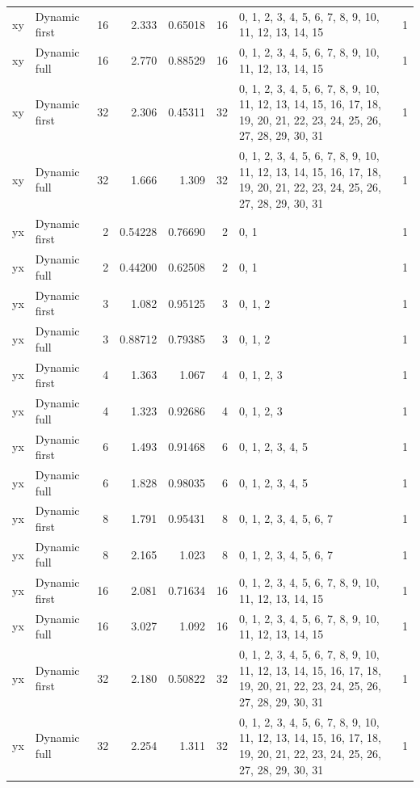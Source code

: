 \documentclass[10pt,a4paper]{article}
\begin{document}
\begin{longtable}{@{}p{23mm}p{29mm}rrrrp{36mm}r@{}}
xy & Dynamic first & 16 & 2.333 & 0.65018 & 16 & 0, 1, 2, 3, 4, 5, 6, 7, 8, 9, 10, 11, 12, 13, 14, 15 & 1 \\
xy & Dynamic full & 16 & 2.770 & 0.88529 & 16 & 0, 1, 2, 3, 4, 5, 6, 7, 8, 9, 10, 11, 12, 13, 14, 15 & 1 \\
xy & Dynamic first & 32 & 2.306 & 0.45311 & 32 & 0, 1, 2, 3, 4, 5, 6, 7, 8, 9, 10, 11, 12, 13, 14, 15, 16, 17, 18, 19, 20, 21, 22, 23, 24, 25, 26, 27, 28, 29, 30, 31 & 1 \\
xy & Dynamic full & 32 & 1.666 & 1.309 & 32 & 0, 1, 2, 3, 4, 5, 6, 7, 8, 9, 10, 11, 12, 13, 14, 15, 16, 17, 18, 19, 20, 21, 22, 23, 24, 25, 26, 27, 28, 29, 30, 31 & 1 \\
yx & Dynamic first & 2 & 0.54228 & 0.76690 & 2 & 0, 1 & 1 \\
yx & Dynamic full & 2 & 0.44200 & 0.62508 & 2 & 0, 1 & 1 \\
yx & Dynamic first & 3 & 1.082 & 0.95125 & 3 & 0, 1, 2 & 1 \\
yx & Dynamic full & 3 & 0.88712 & 0.79385 & 3 & 0, 1, 2 & 1 \\
yx & Dynamic first & 4 & 1.363 & 1.067 & 4 & 0, 1, 2, 3 & 1 \\
yx & Dynamic full & 4 & 1.323 & 0.92686 & 4 & 0, 1, 2, 3 & 1 \\
yx & Dynamic first & 6 & 1.493 & 0.91468 & 6 & 0, 1, 2, 3, 4, 5 & 1 \\
yx & Dynamic full & 6 & 1.828 & 0.98035 & 6 & 0, 1, 2, 3, 4, 5 & 1 \\
yx & Dynamic first & 8 & 1.791 & 0.95431 & 8 & 0, 1, 2, 3, 4, 5, 6, 7 & 1 \\
yx & Dynamic full & 8 & 2.165 & 1.023 & 8 & 0, 1, 2, 3, 4, 5, 6, 7 & 1 \\
yx & Dynamic first & 16 & 2.081 & 0.71634 & 16 & 0, 1, 2, 3, 4, 5, 6, 7, 8, 9, 10, 11, 12, 13, 14, 15 & 1 \\
yx & Dynamic full & 16 & 3.027 & 1.092 & 16 & 0, 1, 2, 3, 4, 5, 6, 7, 8, 9, 10, 11, 12, 13, 14, 15 & 1 \\
yx & Dynamic first & 32 & 2.180 & 0.50822 & 32 & 0, 1, 2, 3, 4, 5, 6, 7, 8, 9, 10, 11, 12, 13, 14, 15, 16, 17, 18, 19, 20, 21, 22, 23, 24, 25, 26, 27, 28, 29, 30, 31 & 1 \\
yx & Dynamic full & 32 & 2.254 & 1.311 & 32 & 0, 1, 2, 3, 4, 5, 6, 7, 8, 9, 10, 11, 12, 13, 14, 15, 16, 17, 18, 19, 20, 21, 22, 23, 24, 25, 26, 27, 28, 29, 30, 31 & 1 \\
\end{longtable}\normalsize\setlength{\tabcolsep}{6pt}
\clearpage
\end{document}

